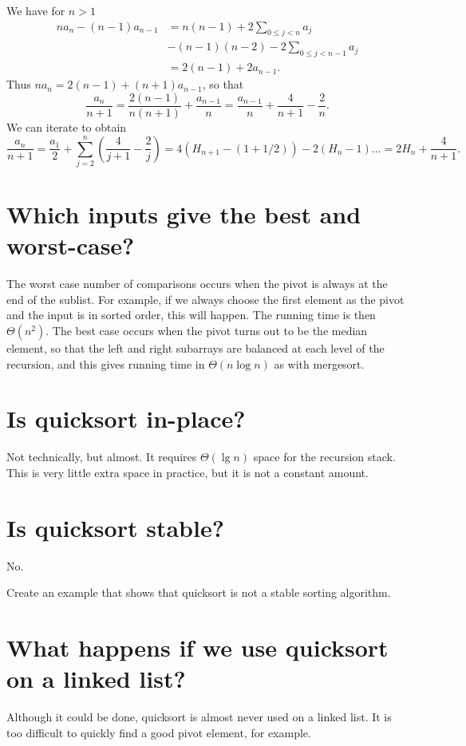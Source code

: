 We have for $n>1$
\begin{align*}
na_n - (n-1) a_{n-1} & = n(n-1) + 2 \sum_{0\leq j < n} a_j \\
& - (n-1)(n-2) - 2\sum_{0 \leq j < n - 1} a_j \\
& = 2(n - 1) + 2 a_{n-1}\text{.}
\end{align*}
Thus $na_n = 2(n - 1) + (n+1)a_{n-1}$, so that 
$$
\frac{a_n}{n+1} = \frac{2(n-1)}{n(n+1)} + \frac{a_{n-1}}{n} = 
\frac{a_{n-1}}{n} + \frac{4}{n+1} - \frac{2}{n}\text{.}
$$
We can iterate to obtain
$$\frac{a_n}{n+1} = \frac{a_1}{2} + \sum_{j=2}^n \left(\frac{4}{j+1} - 
\frac{2}{j}\right) = 4(H_{n+1} - (1+1/2)) - 2(H_n - 1)\dots = 2H_n + \frac{4}{n+1}\text{.}$$

\section{Which inputs give the best and worst-case?}
The worst case number of comparisons occurs when the pivot is always at the end of the sublist. 
For example, if we always choose the first element as the pivot and the input is in sorted order, this will happen. 
The running time is then $\Theta(n^2)$. 
The best case occurs when the pivot turns out to be the median element, so that the left and right subarrays are balanced at each level of the recursion, 
and this gives running time in $\Theta(n\log n)$ as with mergesort.

\section{Is quicksort in-place?}
Not technically, but almost. It requires $\Theta(\lg n)$ space for the recursion stack. This is very little extra space in practice, but it is not a constant amount.

\section{Is quicksort stable?}
No.
\begin{Boxample}[5]
Create an example that shows that quicksort is not a stable sorting algorithm.
\end{Boxample}

\section{What happens if we  use quicksort on a linked list?}
Although it could be done, quicksort is almost never used on a linked list. It is too difficult to quickly find a good pivot element, for example.

